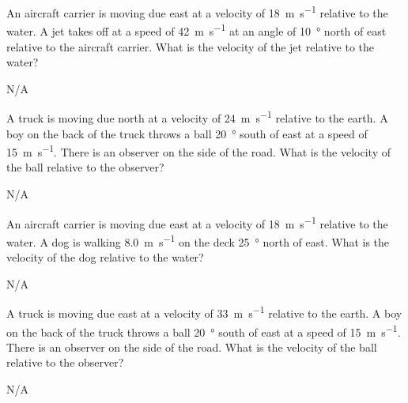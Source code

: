 \begin{question}[ID=relative-B-Q01,topic=relative-motion,difficulty=B]
    An aircraft carrier is moving due east at a velocity of
        \SI{18}{\meter\per\second} relative to the water.
    A jet takes off at a speed of \SI{42}{\meter\per\second}
        at an angle of \SI{10}{\degree} north of east relative
        to the aircraft carrier.
    What is the velocity of the jet relative to the water?
\end{question}
\begin{solution}
    N/A
\end{solution}


\begin{question}[ID=relative-B-Q02,topic=relative-motion,difficulty=B]
    A truck is moving due north at a velocity of \SI{24}{\meter\per\second}
        relative to the earth.
    A boy on the back of the truck throws a ball \SI{20}{\degree}
        south of east at a speed of \SI{15}{\meter\per\second}.
    There is an observer on the side of the road.
    What is the velocity of the ball relative to the observer?
\end{question}
\begin{solution}
    N/A
\end{solution}


\begin{question}[ID=relative-B-Q03,topic=relative-motion,difficulty=B]
    An aircraft carrier is moving due east at a velocity of
        \SI{18}{\meter\per\second} relative to the water.
    A dog is walking \SI{8.0}{\meter\per\second} on the deck
        \SI{25}{\degree} north of east.
    What is the velocity of the dog relative to the water?
\end{question}
\begin{solution}
    N/A
\end{solution}


\begin{question}[ID=relative-B-Q04,topic=relative-motion,difficulty=B]
    A truck is moving due east at a velocity of \SI{33}{\meter\per\second}
        relative to the earth.
    A boy on the back of the truck throws a ball \SI{20}{\degree}
        south of east at a speed of \SI{15}{\meter\per\second}.
    There is an observer on the side of the road.
    What is the velocity of the ball relative to the observer?
\end{question}
\begin{solution}
    N/A
\end{solution}


